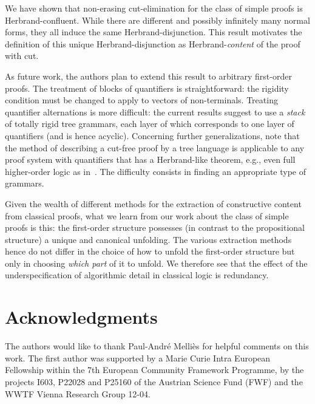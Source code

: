 \documentclass{LMCS}
\theoremstyle{plain}
\theoremstyle{definition}
\begin{document}
We have shown that non-erasing cut-elimination for the class of simple
proofs is Herbrand-confluent. While there are different and possibly
infinitely many normal forms, they all induce the same
Herbrand-disjunction. This result motivates the definition of this
unique Herbrand-disjunction as Herbrand-{\em content} of the proof
with cut.

As future work, the authors plan to extend this result to arbitrary
first-order proofs. The treatment of blocks of quantifiers is straightforward:
the rigidity condition must be changed to apply to vectors of non-terminals.
Treating quantifier alternations is more difficult: the current
results suggest to use a \emph{stack} of totally rigid tree grammars,
each layer of which corresponds to one layer of quantifiers (and is
hence acyclic). Concerning further generalizations, note that the 
method of describing a cut-free proof by a tree language is
applicable to any proof system with quantifiers that has a
Herbrand-like theorem, e.g., even full higher-order logic as
in~\cite{Miller87Compact}. The difficulty consists in finding an
appropriate type of grammars.

Given the wealth of different methods for the extraction of
constructive content from classical proofs, what we learn from our work
about the class of simple proofs is this: the
first-order structure possesses (in contrast to the propositional
structure) a unique and canonical unfolding. The various extraction
methods hence do not differ in the choice of how to unfold the
first-order structure but only in choosing {\em which part} of it to
unfold. We therefore see that the effect of the underspecification of
algorithmic detail in classical logic is redundancy.


\section*{Acknowledgments}
The authors would like to thank Paul-Andr\'{e} Melli\`{e}s for helpful comments
on this work. The first author was supported by a Marie Curie Intra European
Fellowship within the 7th European Community Framework Programme, by the
projects I603, P22028 and P25160 of the Austrian Science Fund (FWF) and
the WWTF Vienna Research Group 12-04.





\end{document}
